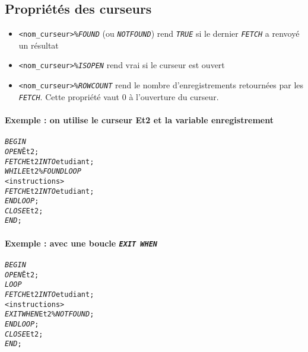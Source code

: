 \documentclass[10pt]{article}
\begin{document}
        \subsection{Propriétés des curseurs}
            \begin{itemize}
                \item \texttt{<nom\_curseur>\%}\emph{\texttt{FOUND}} (ou \emph{\texttt{NOTFOUND}}) rend \emph{\texttt{TRUE}} si le dernier \emph{\texttt{FETCH}} a renvoyé un résultat
                \item \texttt{<nom\_curseur>\%}\emph{\texttt{ISOPEN}} rend vrai si le curseur est ouvert
                \item \texttt{<nom\_curseur>\%}\emph{\texttt{ROWCOUNT}} rend le nombre d'enregistrements retournées par les \emph{\texttt{FETCH}}. Cette propriété vaut 0 à l'ouverture du curseur.
            \end{itemize}

            \paragraph{Exemple : on utilise le curseur Et2 et la variable enregistrement}
                \begin{alltt}
                    \begin{tabbing}
\emph{BEGIN}\=\\
    \>\emph{OPEN} \= Et2;\\
    \>\emph{FETCH}\> Et2 \emph{INTO} etudiant;\\
    \>\emph{WHILE}\> Et2\%\emph{FOUND LOOP}\\
        \>\><instructions>\\
        \>\>\emph{FETCH} Et2 \emph{INTO} etudiant;\\
    \>\emph{END LOOP};\\
    \>\emph{CLOSE} Et2;\\
\emph{END};
                    \end{tabbing}
                \end{alltt}

            \paragraph{Exemple : avec une boucle \emph{\texttt{EXIT WHEN}}}
                \begin{alltt}
                    \begin{tabbing}
\emph{BEGIN}\=\\
    \>\emph{OPEN} \= Et2;\\
    \>\emph{LOOP}\\
        \>\>\emph{FETCH} Et2 \emph{INTO} etudiant;\\
        \>\><instructions>\\
        \>\>\emph{EXIT WHEN} Et2\%\emph{NOTFOUND};\\
    \>\emph{END LOOP};\\
    \>\emph{CLOSE} Et2;\\
\emph{END};
                    \end{tabbing}
                \end{alltt}
                
\end{document}
